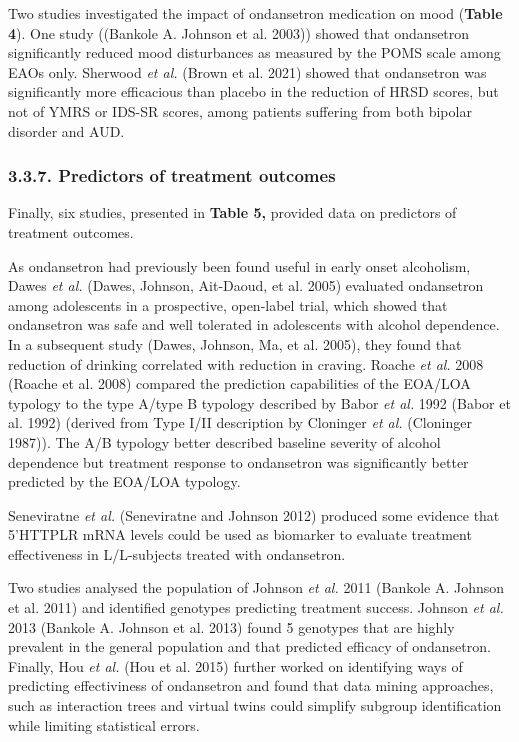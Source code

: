 \documentclass[
  12pt,
]{article}
\begin{document}
Two studies investigated the impact of ondansetron medication on mood
(\textbf{Table 4}). One study ((Bankole A. Johnson et al. 2003)) showed
that ondansetron significantly reduced mood disturbances as measured by
the POMS scale among EAOs only. Sherwood \emph{et al.} (Brown et al.
2021) showed that ondansetron was significantly more efficacious than
placebo in the reduction of HRSD scores, but not of YMRS or IDS-SR
scores, among patients suffering from both bipolar disorder and AUD.

\subsubsection{3.3.7. Predictors of treatment
outcomes}\label{predictors-of-treatment-outcomes}

Finally, six studies, presented in \textbf{Table 5,} provided data on
predictors of treatment outcomes.

As ondansetron had previously been found useful in early onset
alcoholism, Dawes \emph{et al.} (Dawes, Johnson, Ait-Daoud, et al. 2005)
evaluated ondansetron among adolescents in a prospective, open-label
trial, which showed that ondansetron was safe and well tolerated in
adolescents with alcohol dependence. In a subsequent study (Dawes,
Johnson, Ma, et al. 2005), they found that reduction of drinking
correlated with reduction in craving. Roache \emph{et al.} 2008 (Roache
et al. 2008) compared the prediction capabilities of the EOA/LOA
typology to the type A/type B typology described by Babor \emph{et al.}
1992 (Babor et al. 1992) (derived from Type I/II description by
Cloninger \emph{et al.} (Cloninger 1987)). The A/B typology better
described baseline severity of alcohol dependence but treatment response
to ondansetron was significantly better predicted by the EOA/LOA
typology.

Seneviratne \emph{et al.} (Seneviratne and Johnson 2012) produced some
evidence that 5'HTTPLR mRNA levels could be used as biomarker to
evaluate treatment effectiveness in L/L-subjects treated with
ondansetron.

Two studies analysed the population of Johnson \emph{et al.} 2011
(Bankole A. Johnson et al. 2011) and identified genotypes predicting
treatment success. Johnson \emph{et al.} 2013 (Bankole A. Johnson et al.
2013) found 5 genotypes that are highly prevalent in the general
population and that predicted efficacy of ondansetron. Finally, Hou
\emph{et al.} (Hou et al. 2015) further worked on identifying ways of
predicting effectiviness of ondansetron and found that data mining
approaches, such as interaction trees and virtual twins could simplify
subgroup identification while limiting statistical errors.
\end{document}
